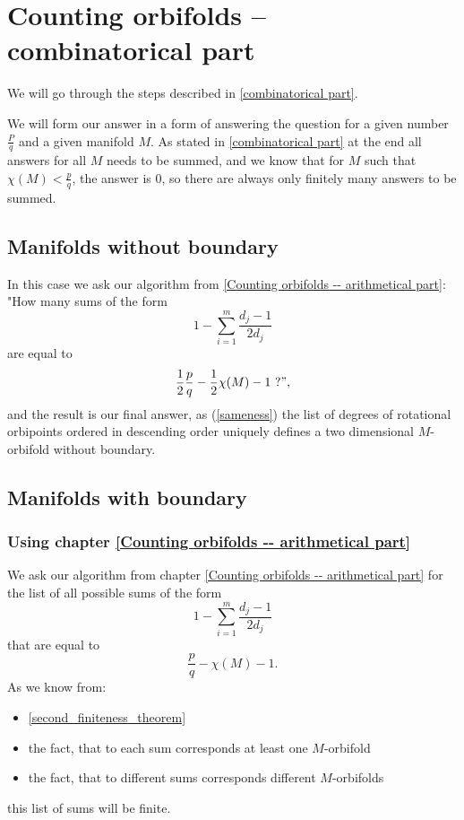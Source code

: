\chapter{Counting orbifolds -- combinatorical part}\label{Counting orbifolds -- combinatorical part}
We will go through the steps described in \ref{combinatorical part}.

We will form our answer in a form of answering the 
question for a given number $\frac{P}{q}$ and a given manifold $M$. 
As stated in \ref{combinatorical part} at the end all answers for all $M$ needs to be summed, 
and we know that for $M$ such that $\chi(M) < \frac{p}{q}$, the answer is $0$, so there 
are always only finitely many answers to be summed. 

\section{Manifolds without boundary}
In this case we ask our algorithm from \ref{Counting orbifolds -- arithmetical part}: 
"How many sums of the form
\begin{equation}
1-\sum_{i=1}^m \frac{d_j-1}{2d_j} 
\end{equation}
are equal to 
\begin{equation}
\frac{1}{2}\frac{p}{q} - \frac{1}{2}\chi(M) -1\ ?",
\end{equation}
and the result is our final answer, as (\ref{sameness}) the list of degrees of rotational orbipoints ordered 
in descending order uniquely defines a two dimensional $M$-orbifold without boundary. 
\section{Manifolds with boundary}
\subsection{Using chapter \ref{Counting orbifolds -- arithmetical part}}\label{use algorithm step}
We ask our algorithm from chapter \ref{Counting orbifolds -- arithmetical part} for the list 
of all possible sums of the form
\begin{equation}
1-\sum_{i=1}^m \frac{d_j-1}{2d_j} 
\end{equation}
that are equal to 
\begin{equation}
\frac{p}{q} - \chi(M) - 1. 
\end{equation}
As we know from: 
\begin{itemize}
\item \ref{second_finiteness_theorem} 
\item the fact, that to each 
sum corresponds at least one $M$-orbifold
\item the fact, that to different sums corresponds different $M$-orbifolds
\end{itemize}
this list of sums will be finite. 
